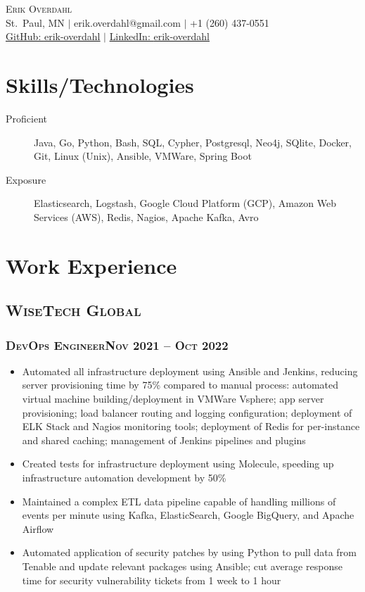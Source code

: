 \documentclass{article}
\newcommand{\resumeSection}[1]{\section*{#1}}
\newcommand{\institution}[1]{\subsection*{\scshape{#1}}}
\newcommand{\jobPosition}[3]{\subsubsection*{\scshape{#1}\hfill #2 -- #3}}
\begin{document}
\begin{center}
  {\Huge\scshape{Erik Overdahl}}
  \\\vspace{5pt}
  \normalsize{
    St.\ Paul, MN
    $|$
    erik.overdahl@gmail.com
    $|$
    +1 (260) 437-0551
    \\
    \href{https://github.com/erik-overdahl}{GitHub: \underline{erik-overdahl}}
    $|$
    \href{https://linkedin.com/in/erik-overdahl}{LinkedIn: \underline{erik-overdahl}}
  }
\end{center}

\resumeSection{Skills/Technologies}
  \begin{description}
      \item [Proficient]
          Java,
          Go,
          Python,
          Bash,
          SQL,
          Cypher,
          Postgresql,
          Neo4j,
          SQlite,
          Docker,
          Git,
          Linux (Unix),
          Ansible,
          VMWare,
          Spring Boot

      \item [Exposure]
          Elasticsearch,
          Logstash,
          Google Cloud Platform (GCP),
          Amazon Web Services (AWS),
          Redis,
          Nagios,
          Apache Kafka,
          Avro
  \end{description}

\resumeSection{Work Experience}

  \institution{WiseTech Global}

    \jobPosition{DevOps Engineer}{Nov 2021}{Oct 2022}
    \begin{itemize}[noitemsep]
      \item
            Automated all infrastructure deployment using Ansible and
            Jenkins, reducing server provisioning time by 75\% compared to manual
            process: automated virtual machine building/deployment in VMWare
            Vsphere; app server provisioning; load balancer routing and logging
            configuration; deployment of ELK Stack and Nagios monitoring tools;
            deployment of Redis for per-instance and shared caching; management of
            Jenkins pipelines and plugins
      \item
            Created tests for infrastructure deployment using Molecule,
            speeding up infrastructure automation development by 50\%
      \item
            Maintained a complex ETL data pipeline capable of handling
            millions of events per minute using Kafka, ElasticSearch, Google BigQuery,
            and Apache Airflow
      \item
            Automated application of security patches by using Python to
            pull data from Tenable and update relevant packages using Ansible; cut
            average response time for security vulnerability tickets from 1 week to
            1 hour
    \end{itemize}
\end{document}
